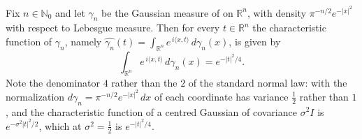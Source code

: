 \begin{lemma}
Fix $n \in \mathbb{N}_0$ and let $\gamma_n$ be the Gaussian measure of
 on $\mathbb{R}^n$, with density
$\pi^{-n/2} e^{-|x|^2}$ with respect to Lebesgue measure.  Then for every
$t \in \mathbb{R}^n$ the characteristic function of $\gamma_n$, namely
$\widehat{\gamma_n}(t) = \int_{\mathbb{R}^n} e^{\,i \langle x, t\rangle}
  \, d\gamma_n(x)$, is given by
\[
  \int_{\mathbb{R}^n} e^{\,i \langle x, t\rangle} \, d\gamma_n(x)
    = e^{-|t|^2/4} .
\]
Note the denominator $4$ rather than the $2$ of the standard normal law: with the
normalization $d\gamma_n = \pi^{-n/2} e^{-|x|^2}\,dx$ of 
each coordinate has variance $\tfrac12$ rather than $1$, and the characteristic
function of a centred Gaussian of covariance $\sigma^2 I$ is
$e^{-\sigma^2|t|^2/2}$, which at $\sigma^2 = \tfrac12$ is $e^{-|t|^2/4}$.
\end{lemma}
